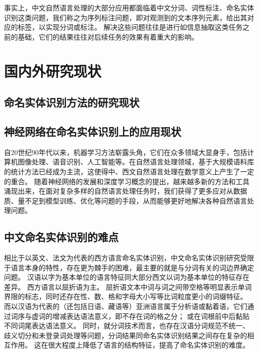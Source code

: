 事实上，中文自然语言处理的大部分应用都面临着中文分词、词性标注、命名实体识别这类问题，我们称之为序列标注问题，即对观测到的文本序列元素，给出其对应的标签，以实现分词或标注。
解决这些问题往往是进行如信息抽取这类任务之前的基础，它们的结果往往对后续任务的效果有着重大的影响。

\section{国内外研究现状}
\label{sec:current}
\subsection{命名实体识别方法的研究现状}
\subsection{神经网络在命名实体识别上的应用现状}
自20世纪90年代以来，机器学习方法崭露头角，它们在众多领域大显身手，包括计算机图像处理、语音识别、人工智能等。在自然语言处理领域，基于大规模语料库的统计方法已经成为主流，这使得中、西文自然语言处理在数学意义上产生了一定的重合。
随着神经网络的发展和深度学习概念的提出，越来越多新的方法和工具涌现出来，在面对复杂多样的自然语言处理任务时，我们获得了更多应对从数据质、量不足到模型训练、优化等问题的手段，从而能够更好地解决各种自然语言处理问题。
\subsection{中文命名实体识别的难点}
相比于以英文、法文为代表的西方语言命名实体识别，中文命名实体识别研究受限于语言本身的特性，存在更为棘手的困难，最主要的就是与分词有关的词边界确定问题。
汉语以字为基本单位的语言特征同大部分西文以词为基本单位的特征存在差异。
西方语言以屈折语为主。
屈折语文本中词与词之间带空格等明显表示单词界限的标志，同时还存在性、数、格和字母大小写等比词粒度更小的词缀特征。
而以汉语为代表的（还包括日语、藏语等）亚洲语言属于分析语或黏着语，它们通过词序与虚词的增减表达语法意义，即不存在词的格之分；
或在词根前中后黏贴不同词尾表达语法意义。
同时，就分词技术而言，也存在汉语分词规范不统一、歧义切分和未登录词处理等问题，分词结果同命名实体识别结果之间存在复杂的相互作用。
这在很大程度上降低了语言的结构特征，提高了命名实体识别的难度。
